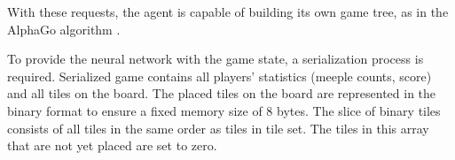 With these requests, the agent is capable of building its own game tree, as in the AlphaGo algorithm \cite{AlphaGoAlgorithm}.

To provide the neural network with the game state, a serialization process is required. Serialized game contains all players' statistics (meeple counts, score) and all tiles on the board. The placed tiles on the board are represented in the binary format to ensure a fixed memory size of 8 bytes. The slice of binary tiles consists of all tiles in the same order as tiles in tile set. The tiles in this array that are not yet placed are set to zero.
